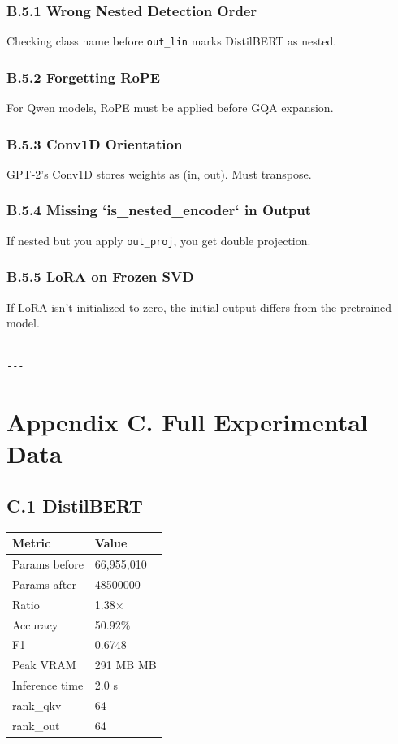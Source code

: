 \subsubsection{B.5.1 Wrong Nested Detection Order}

Checking class name before \texttt{out\_lin} marks DistilBERT as nested.

\subsubsection{B.5.2 Forgetting RoPE}

For Qwen models, RoPE must be applied before GQA expansion.

\subsubsection{B.5.3 Conv1D Orientation}

GPT-2's Conv1D stores weights as (in, out). Must transpose.

\subsubsection{B.5.4 Missing `is\_nested\_encoder` in Output}

If nested but you apply \texttt{out\_proj}, you get double projection.

\subsubsection{B.5.5 LoRA on Frozen SVD}

If LoRA isn't initialized to zero, the initial output differs from the 
pretrained model.
\begin{lstlisting}

---
\end{lstlisting}

\section{Appendix C. Full Experimental Data}

\subsection{C.1 DistilBERT}

\begin{table}[H]
\centering
\small
\begin{tabular}{ll}
\toprule
\textbf{Metric} & \textbf{Value} \\
\midrule
Params before & 66,955,010 \\
Params after & 48500000 \\
Ratio & 1.38$\times$ \\
Accuracy & 50.92\% \\
F1 & 0.6748 \\
Peak VRAM & 291 MB MB \\
Inference time & 2.0 s \\
rank\_qkv & 64 \\
rank\_out & 64 \\
\bottomrule
\end{tabular}
\end{table}

